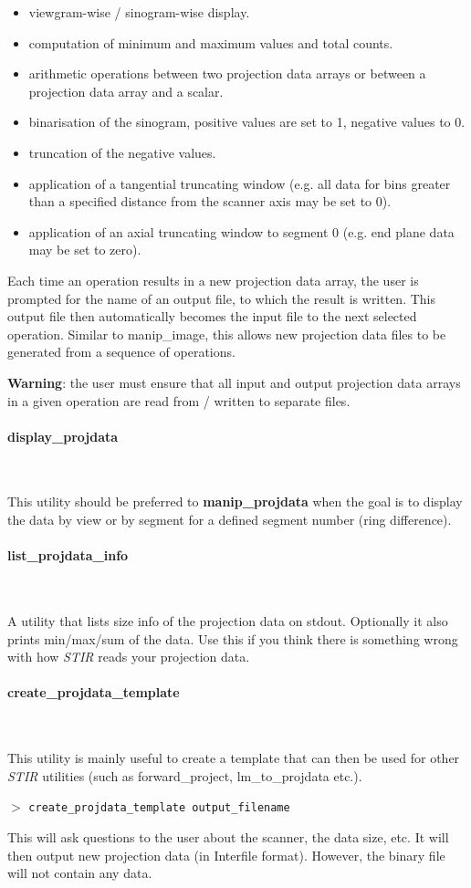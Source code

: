 \documentclass{article}
\newcommand{\subsubsubsection}[1]{\paragraph{#1}\mbox{} \\}
\newcommand{\cmdline}[1]{\par \noindent $>$ \texttt{#1}\par}
\begin{document}
{{{\begin{itemize}
\item viewgram-wise / sinogram-wise display.
\item computation of minimum and maximum values and total counts.
\item arithmetic operations between two projection data arrays or 
between a projection data array and a scalar.
\item binarisation of the sinogram, positive values are set to 1, 
negative values to 0.
\item truncation of the negative values.
\item application of a tangential truncating window (e.g. all data 
for bins greater than a specified distance from the scanner axis 
may be set to 0).
\item application of an axial truncating window to segment 0 (e.g. 
end plane data may be set to zero).
\end{itemize}
Each time an operation results in a new projection data array, 
the user is prompted for the name of an output file, to which 
the result is written. This output file then automatically becomes 
the input file to the next selected operation. Similar to manip\_image, 
this allows new projection data files to be generated from a 
sequence of operations.


\textbf{Warning}: the user must ensure that all input and output projection 
data arrays in a given operation are read from / written to separate 
files.

{ \subsubsubsection{display\_projdata}
}

This utility should be preferred to \textbf{manip\_projdata} when the 
goal is to display the data by view or by segment for a defined 
segment number (ring difference).

{ \subsubsubsection{list\_projdata\_info}
}

A utility that lists size info of the projection data on stdout. Optionally
it also prints min/max/sum of the data. 
Use this if you think there is something wrong with how \textit{STIR} 
reads your projection data.

{ \subsubsubsection{create\_projdata\_template}
}

This utility is mainly useful to create a template that can then 
be used for other \textit{STIR} utilities (such as forward\_project, lm\_to\_projdata 
etc.).
\cmdline{create\_projdata\_template output\_filename}

This will ask questions to the user about the scanner, the data 
size, etc. It will then output new projection data (in Interfile 
format). However, the binary file will not contain any data.

}}}
\end{document}
